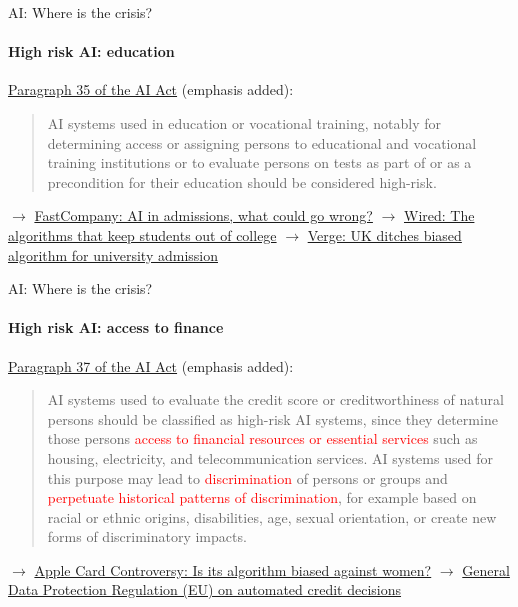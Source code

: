 \begin{frame}{AI: Where is the crisis?}
  \framesubtitle{High risk AI: education}
  \href{https://eur-lex.europa.eu/resource.html?uri=cellar:e0649735-a372-11eb-9585-01aa75ed71a1.0001.02/DOC_1&format=PDF}{Paragraph 35 of the AI Act} (emphasis added):
  \newline
  \begin{quotation}
    \noindent AI systems used in education or vocational training, notably for determining access or assigning persons to educational and vocational training institutions or to evaluate persons on tests as part of or as a precondition for their education should be considered high-risk.
  \end{quotation}
  \newline
  $\rightarrow$ \href{https://www.fastcompany.com/90342596/schools-are-quietly-turning-to-ai-to-help-pick-who-gets-in-what-could-go-wrong}{FastCompany: AI in admissions, what could go wrong?}
  \newline
  $\rightarrow$ \href{https://www.wired.com/story/algorithm-set-students-grades-altered-futures/}{Wired: The algorithms that keep students out of college}
  \newline
  $\rightarrow$ \href{https://www.theverge.com/2020/8/17/21372045/uk-a-level-results-algorithm-biased-coronavirus-covid-19-pandemic-university-applications}{Verge: UK ditches biased algorithm for university admission}

\end{frame}

\begin{frame}{AI: Where is the crisis?}
  \framesubtitle{High risk AI: access to finance}
  \href{https://eur-lex.europa.eu/resource.html?uri=cellar:e0649735-a372-11eb-9585-01aa75ed71a1.0001.02/DOC_1&format=PDF}{Paragraph 37 of the AI Act} (emphasis added):
  \begin{quotation}
    \noindent AI systems used to evaluate the credit score or creditworthiness of natural persons should be classified as high-risk AI systems, since they determine those persons \textcolor{red}{access to financial resources or essential services} such as housing, electricity, and telecommunication services. AI systems used for this purpose may lead to \textcolor{red}{discrimination} of persons or groups and \textcolor{red}{perpetuate historical patterns of discrimination}, for example based on racial or ethnic origins, disabilities, age, sexual orientation, or create new forms of discriminatory impacts.
  \end{quotation}
  \newline
  $\rightarrow$ \href{https://qz.com/1748321/the-role-of-goldman-sachs-algorithms-in-the-apple-credit-card-scandal/}{Apple Card Controversy: Is its algorithm biased against women?}
  \newline
  $\rightarrow$ \href{https://www.reubenbinns.com/blog/how-to-comply-with-gdpr-article-22-automated-credit-decisions/}{General Data Protection Regulation (EU) on automated credit decisions}
\end{frame}

